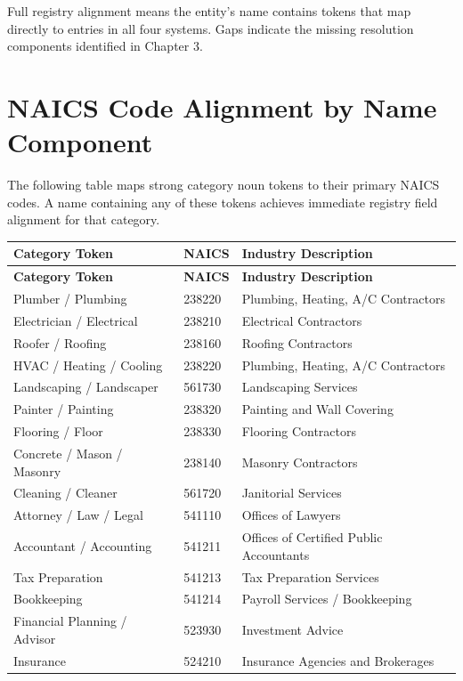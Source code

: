\documentclass[12pt, openany]{book}
\theoremstyle{thmstyle}
\theoremstyle{defstyle}
\begin{document}
Full registry alignment means the entity's name contains tokens that map directly to entries in all four systems. Gaps indicate the missing resolution components identified in Chapter 3.

\section{NAICS Code Alignment by Name Component}

The following table maps strong category noun tokens to their primary NAICS codes. A name containing any of these tokens achieves immediate registry field alignment for that category.

\begin{longtable}{p{1.4in}p{0.9in}p{3.2in}}
\toprule
\textbf{Category Token} & \textbf{NAICS} & \textbf{Industry Description} \\
\midrule
\endfirsthead
\toprule
\textbf{Category Token} & \textbf{NAICS} & \textbf{Industry Description} \\
\midrule
\endhead
\bottomrule
\endlastfoot
Plumber / Plumbing & 238220 & Plumbing, Heating, A/C Contractors \\
Electrician / Electrical & 238210 & Electrical Contractors \\
Roofer / Roofing & 238160 & Roofing Contractors \\
HVAC / Heating / Cooling & 238220 & Plumbing, Heating, A/C Contractors \\
Landscaping / Landscaper & 561730 & Landscaping Services \\
Painter / Painting & 238320 & Painting and Wall Covering \\
Flooring / Floor & 238330 & Flooring Contractors \\
Concrete / Mason / Masonry & 238140 & Masonry Contractors \\
Cleaning / Cleaner & 561720 & Janitorial Services \\
Attorney / Law / Legal & 541110 & Offices of Lawyers \\
Accountant / Accounting & 541211 & Offices of Certified Public Accountants \\
Tax Preparation & 541213 & Tax Preparation Services \\
Bookkeeping & 541214 & Payroll Services / Bookkeeping \\
Financial Planning / Advisor & 523930 & Investment Advice \\
Insurance & 524210 & Insurance Agencies and Brokerages \\

\end{longtable}
\end{document}
